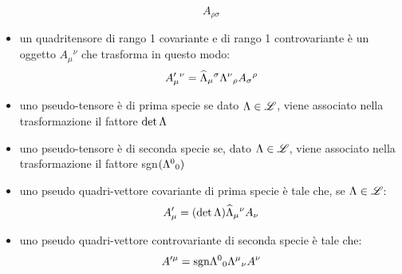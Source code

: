 \begin{itemize}
\begin{equation}
  A_{\rho\sigma}
\end{equation}
\item un quadritensore di rango 1 covariante e di rango 1
controvariante \`e un oggetto $A_{\mu}{}^{\nu}$ che trasforma in
questo modo:
\begin{equation}
  A'_{\mu}{}^{\nu}=\widehat{\Lambda}_{\mu}{}^{\sigma}\Lambda^{\nu}{}_{\rho}
  A_{\sigma}{}^{\rho}
\end{equation}
\item uno pseudo-tensore \`e di prima specie se dato
$\Lambda\in\mathscr{L}$, viene associato nella trasformazione il fattore
$\det\Lambda$
\item uno pseudo-tensore \`e di seconda specie se, dato
$\Lambda\in\mathscr{L}$, viene associato nella trasformazione il fattore
sgn$(\Lambda^0{}_0)$
\item uno pseudo quadri-vettore covariante di prima specie \`e tale che, se
$\Lambda\in\mathscr{L}$:
\begin{equation}
 A'_{\mu}=(\det\Lambda)\widehat{\Lambda}_{\mu}{}^{\nu}A_{\nu}
\end{equation}
\item uno pseudo quadri-vettore controvariante di seconda specie \`e tale che:
$$
A'^{\mu}=\mbox{sgn}\Lambda^0{}_{0}\Lambda^{\mu}{}_{\nu}A^{\nu}
$$
\end{itemize}
